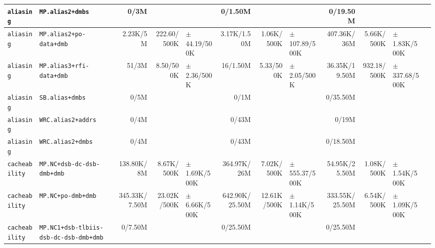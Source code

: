 \begin{tabular}{l l  | r r l | r r l | r r l l}
       \verb|aliasing| &                                       \verb|MP.alias2+dmbs| &           0/3M &                       &                   &        0/1.50M &                       &                   &       0/19.50M &                       &                    & \\ \hline 
       \verb|aliasing| &                                \verb|MP.alias2+po-data+dmb| &       2.23K/5M &           222.60/500K &  $\pm$ 44.19/500K &    3.17K/1.50M &            1.06K/500K & $\pm$ 107.89/500K &    407.36K/36M &            5.66K/500K &   $\pm$ 1.83K/500K & \\ \hline 
       \verb|aliasing| &                               \verb|MP.alias3+rfi-data+dmb| &          51/3M &             8.50/500K &   $\pm$ 2.36/500K &       16/1.50M &             5.33/500K &   $\pm$ 2.05/500K &  36.35K/19.50M &           932.18/500K &  $\pm$ 337.68/500K & \\ \hline 
       \verb|aliasing| &                                        \verb|SB.alias+dmbs| &           0/5M &                       &                   &           0/1M &                       &                   &       0/35.50M &                       &                    & \\ \hline 
       \verb|aliasing| &                                     \verb|WRC.alias2+addrs| &           0/4M &                       &                   &          0/43M &                       &                   &          0/19M &                       &                    & \\ \hline 
       \verb|aliasing| &                                      \verb|WRC.alias2+dmbs| &           0/4M &                       &                   &          0/43M &                       &                   &       0/18.50M &                       &                    & \\ \hline 
   \verb|cacheability| &                             \verb|MP.NC+dsb-dc-dsb-dmb+dmb| &     138.80K/8M &            8.67K/500K &  $\pm$ 1.69K/500K &    364.97K/26M &            7.02K/500K & $\pm$ 555.37/500K &  54.95K/25.50M &            1.08K/500K &   $\pm$ 1.54K/500K & \\ \hline 
   \verb|cacheability| &                                     \verb|MP.NC+po-dmb+dmb| &  345.33K/7.50M &           23.02K/500K &  $\pm$ 6.66K/500K & 642.90K/25.50M &           12.61K/500K &  $\pm$ 1.14K/500K & 333.55K/25.50M &            6.54K/500K &   $\pm$ 1.09K/500K & \\ \hline 
   \verb|cacheability| &                 \verb|MP.NC1+dsb-tlbiis-dsb-dc-dsb-dmb+dmb| &        0/7.50M &                       &                   &       0/25.50M &                       &                   &       0/25.50M &                       &                    & \\ \hline 

\end{tabular}
